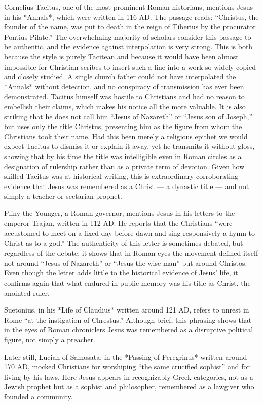 Cornelius Tacitus, one of the most prominent Roman historians, mentions Jesus in his *Annals*, which were written in 116 AD.
The passage reads: “Christus, the founder of the name, was put to death in the reign of Tiberius by the procurator Pontius Pilate.”
The overwhelming majority of scholars consider this passage to be authentic, and the evidence against interpolation is very strong.
This is both because the style is purely Tacitean and because it would have been almost impossible for Christian scribes to insert such a line into a work so widely copied and closely studied.
A single church father could not have interpolated the *Annals* without detection, and no conspiracy of transmission has ever been demonstrated.
Tacitus himself was hostile to Christians and had no reason to embellish their claims, which makes his notice all the more valuable.
It is also striking that he does not call him “Jesus of Nazareth” or “Jesus son of Joseph,” but uses only the title Christus, presenting him as the figure from whom the Christians took their name.
Had this been merely a religious epithet we would expect Tacitus to dismiss it or explain it away, yet he transmits it without gloss, showing that by his time the title was intelligible even in Roman circles as a designation of rulership rather than as a private term of devotion.
Given how skilled Tacitus was at historical writing, this is extraordinary corroborating evidence that Jesus was remembered as a Christ — a dynastic title — and not simply a teacher or sectarian prophet.

Pliny the Younger, a Roman governor, mentions Jesus in his letters to the emperor Trajan, written in 112 AD.
He reports that the Christians “were accustomed to meet on a fixed day before dawn and sing responsively a hymn to Christ as to a god.”
The authenticity of this letter is sometimes debated, but regardless of the debate, it shows that in Roman eyes the movement defined itself not around “Jesus of Nazareth” or “Jesus the wise man” but around Christos.
Even though the letter adds little to the historical evidence of Jesus’ life, it confirms again that what endured in public memory was his title as Christ, the anointed ruler.

Suetonius, in his *Life of Claudius* written around 121 AD, refers to unrest in Rome “at the instigation of Chrestus.”
Although brief, this phrasing shows that in the eyes of Roman chroniclers Jesus was remembered as a disruptive political figure, not simply a preacher.

Later still, Lucian of Samosata, in the *Passing of Peregrinus* written around 170 AD, mocked Christians for worshiping “the same crucified sophist” and for living by his laws.
Here Jesus appears in recognizably Greek categories, not as a Jewish prophet but as a sophist and philosopher, remembered as a lawgiver who founded a community.

